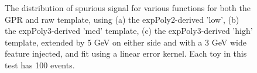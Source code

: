 \begin{figure} 
\begin{center}

\caption{The distribution of spurious signal for various functions for both the GPR and raw template, using (a) the expPoly2-derived 'low', (b) the expPoly3-derived 'med' template, (c) the expPoly3-derived 'high' template, extended by 5 GeV on either side and with a 3 GeV wide feature injected, and fit using a linear error kernel. Each toy in this test has 100 events.}
\label{fig:linearkernel_lowpt_100_Sig}
\end{center}
\end{figure}

